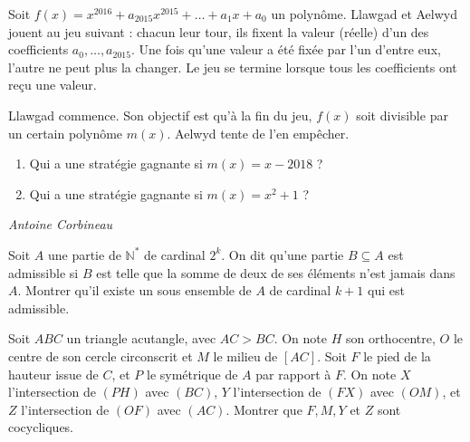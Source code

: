 \begin{exo}{}
Soit $f(x)=x^{2016}+a_{2015}x^{2015}+\dots+a_1x+a_0$ un polynôme. Llawgad et Aelwyd jouent au jeu suivant : chacun leur tour, ils fixent la valeur (réelle) d'un des coefficients $a_0,\dots,a_{2015}$. Une fois qu'une valeur a été fixée par l'un d'entre eux, l'autre ne peut plus la changer. Le jeu se termine lorsque tous les coefficients ont reçu une valeur.

Llawgad commence. Son objectif est qu'à la fin du jeu, $f(x)$ soit divisible par un certain polynôme $m(x)$. Aelwyd tente de l'en empêcher.

\begin{enumerate}
    \item Qui a une stratégie gagnante si $m(x) = x-2018$ ?
    \item Qui a une stratégie gagnante si $m(x) = x^2+1$ ?
\end{enumerate}

\medskip
\textit{Antoine Corbineau}
\end{exo}


\begin{exo}{}
Soit $A$ une partie de $\mathbb{N}^*$ de cardinal $2^k$. On dit qu'une partie $B\subseteq A$ est admissible si $B$ est telle que la somme de deux de ses éléments n'est jamais dans $A$. Montrer qu'il existe un sous ensemble de $A$ de cardinal $k+1$ qui est admissible.
\end{exo}

\begin{exo}{}
Soit $ABC$ un triangle acutangle, avec $AC > BC$. On note $H$ son orthocentre, $O$ le centre de son cercle circonscrit et $M$ le milieu de $[AC]$. Soit $F$ le pied de la hauteur issue de $C$, et $P$ le symétrique de $A$ par rapport à $F$. On note $X$ l'intersection de $(PH)$ avec $(BC)$, $Y$ l'intersection de $(FX)$ avec $(OM)$, et $Z$ l'intersection de $(OF)$ avec $(AC)$. Montrer que $F, M, Y$ et $Z$ sont cocycliques.

\end{exo}

